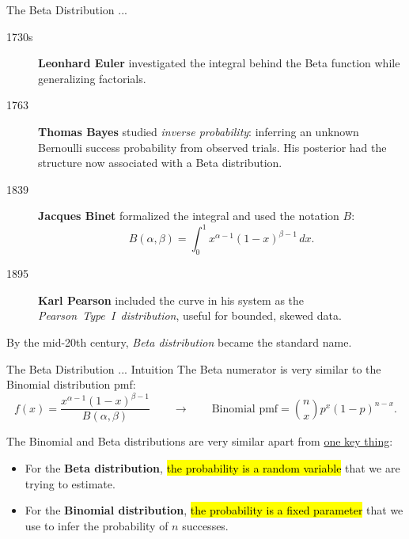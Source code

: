 \documentclass[aspectratio=43,11pt]{beamer}
\begin{document}
  {
    \begin{frame}{The Beta Distribution ...}
      \footnotesize
      \begin{description}
        \item[1730s] \textbf{Leonhard Euler} investigated the integral behind
        the Beta function while generalizing factorials.

        \item[1763] \textbf{Thomas Bayes} studied \emph{inverse probability}:
        inferring an unknown Bernoulli success probability from observed trials.
        His posterior had the structure now associated with a Beta distribution.

        \item[1839] \textbf{Jacques Binet} formalized the integral and used the
        notation $B$:
        \[
        B(\alpha,\beta)
        =\int_0^1 x^{\alpha-1}(1-x)^{\beta-1}\,dx.
        \]

        \item[1895] \textbf{Karl Pearson} included the curve in his system as the
        \emph{Pearson~Type~I~distribution}, useful for bounded, skewed data.
      \end{description}

      \begin{alertblock}{}
        By the mid-20th century, \emph{Beta distribution} became the standard name.
      \end{alertblock}
    \end{frame}

    \begin{frame}{The Beta Distribution ... Intuition}
      \footnotesize
      The Beta numerator is very similar to the Binomial distribution pmf:
      \[
      f(x)
      =
      \frac{x^{\alpha-1}(1-x)^{\beta-1}}{B(\alpha,\beta)}
      \qquad \longrightarrow \qquad
      \text{Binomial pmf}
      =
      \binom{n}{x}p^x(1-p)^{n-x}.
      \]

      The Binomial and Beta distributions are very similar apart from \ul{one key thing}:

      \begin{itemize}
        \item For the {\bf Beta distribution}, \hl{the probability is a random variable} that we are trying to estimate.

        \item For the {\bf Binomial distribution}, \hl{the probability is a fixed parameter} that we use to infer the probability of \(n\) successes.
      \end{itemize}


\end{frame}}
\end{document}
